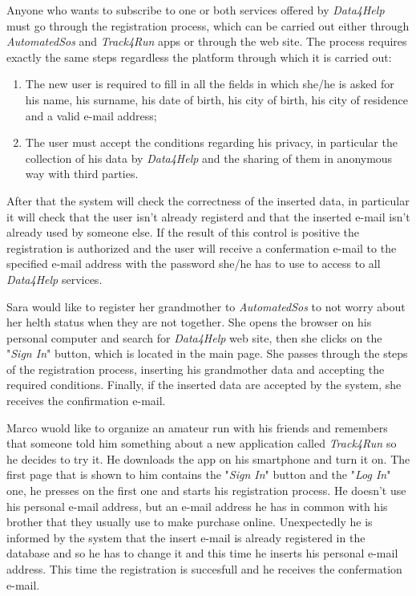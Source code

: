 Anyone who wants to subscribe to one or both services offered by \textit{Data4Help} must go through the registration process, which can be carried out either through \textit{AutomatedSos} and \textit{Track4Run} apps or through the web site.
The process requires exactly the same steps regardless the platform through which it is carried out:
\begin{enumerate}
  \item The new user is required to fill in all the fields in which she/he is asked for his name, his surname, his date of birth, his city of birth, his city of residence and a valid e-mail address;
  \item The user must accept the conditions regarding his privacy, in particular the collection of his data by \textit{Data4Help} and the sharing of them in anonymous way with third parties.
\end{enumerate}
After that the system will check the correctness of the inserted data, in particular it will check that the user isn't already registerd and that the inserted e-mail isn't already used by someone else. If the result of this control is positive the registration is authorized and the user will receive a confermation e-mail to the specified e-mail address with the password she/he has to use to access to all \textit{Data4Help} services.

Sara would like to register her grandmother to \textit{AutomatedSos} to not worry about her helth status when they are not together. She opens the browser on his personal computer and search for \textit{Data4Help} web site, then she clicks on the "\textit{Sign In}" button, which is located in the main page. She passes through the steps of the registration process, inserting his grandmother data and accepting the required conditions. Finally, if the inserted data are accepted by the system, she receives the confirmation e-mail.

Marco wuold like to organize an amateur run with his friends and remembers that someone told him something about a new application called \textit{Track4Run} so he decides to try it. He downloads the app on his smartphone and turn it on. The first page that is shown to him contains the "\textit{Sign In}" button and the "\textit{Log In}" one, he presses on the first one and starts his registration process. He doesn't use his personal e-mail address, but an e-mail address he has in common with his brother that they usually use to make purchase online. Unexpectedly he is informed by the system that the insert e-mail is already registered in the database and so he has to change it and this time he inserts his personal e-mail address. This time the registration is succesfull and he receives the confermation e-mail.

